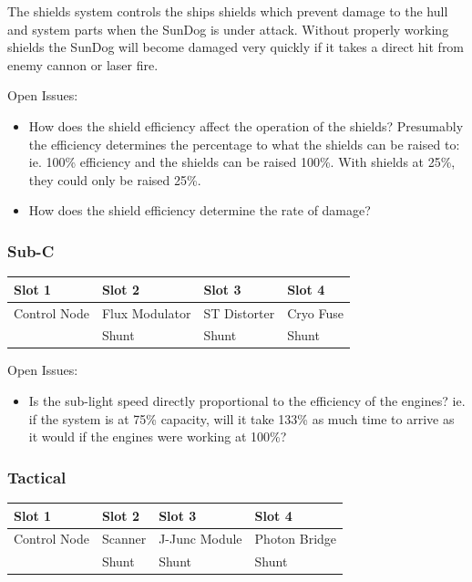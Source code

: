 The shields system controls the ships shields which prevent damage to
the hull and system parts when the SunDog is under attack.  Without
properly working shields the SunDog will become damaged very quickly
if it takes a direct hit from enemy cannon or laser fire.

Open Issues:
\begin{itemize}
\item How does the shield efficiency affect the operation of the shields?
Presumably the efficiency determines the percentage to what the shields can
be raised to:  ie. 100\% efficiency and the shields can be raised 100\%.
With shields at 25\%, they could only be raised 25\%.
\item How does the shield efficiency determine the rate of damage?
\end{itemize}

\subsubsection{Sub-C}

\begin{tabular}{ | p{2.5cm} | p{2.5cm} | p{2.5cm} | p{2.5cm} | }
\hline
Slot 1 & Slot 2 & Slot 3 & Slot 4 \\ \hline
Control Node & Flux Modulator & ST Distorter & Cryo Fuse\\
& Shunt & Shunt & Shunt \\
\hline
\end{tabular}

Open Issues:
\begin{itemize}
\item Is the sub-light speed directly proportional to the efficiency
of the engines?  ie. if the system is at 75\% capacity, will it take
133\% as much time to arrive as it would if the engines were working at
100\%?
\end{itemize}

\subsubsection{Tactical}

\begin{tabular}{ | p{2.5cm} | p{2.5cm} | p{2.5cm} | p{2.5cm} | }
\hline
Slot 1 & Slot 2 & Slot 3 & Slot 4 \\ \hline
Control Node & Scanner & J-Junc Module & Photon Bridge \\
& Shunt & Shunt & Shunt \\
\hline
\end{tabular}

